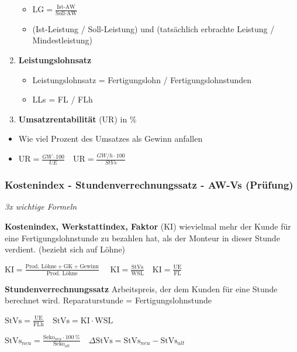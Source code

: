 \begin{enumerate}
  \begin{itemize}
  \item
    $\boxed{\text{LG} = \frac{\text{Ist-AW}}{\text{Soll-AW}}}$
  \item
    (Ist-Leistung / Soll-Leistung) und (tatsächlich erbrachte Leistung /
    Mindestleistung)
  \end{itemize}
\item
  \textbf{Leistungslohnsatz}

  \begin{itemize}
  \item
    Leistungslohnsatz = Fertigungslohn / Fertigungslohnstunden
  \item
    LLs = FL / FLh
  \end{itemize}
\item
  \textbf{Umsatzrentabilität} (UR) in \%
\end{enumerate}

\begin{itemize}
\item
  Wie viel Prozent des Umsatzes als Gewinn anfallen
\item
  $\boxed{\text{UR} = \frac{GW \cdot 100}{UE}} \quad \boxed{\text{UR} = \frac{GW/h \cdot 100}{StVs}}$
\end{itemize}

\subsubsection{Kostenindex - Stundenverrechnungssatz - AW-Vs
(Prüfung)}\label{kostenindex-stundenverrechnungssatz-aw-vs-pruefung}

\emph{3x wichtige Formeln}

\textbf{Kostenindex, Werkstattindex, Faktor} (KI) wievielmal mehr der
Kunde für eine Fertigungslohnstunde zu bezahlen hat, als der Monteur in
dieser Stunde verdient. (bezieht sich auf Löhne)

$\boxed{\text{KI} = \frac{\text{Prod. Löhne} + \text{GK} + \text{Gewinn}}{\text{Prod. Löhne}}} \quad$
$\boxed{\text{KI} = \frac{\text{StVs}}{\text{WSL}}} \quad \boxed{\text{KI} = \frac{\text{UE}}{\text{FL}}}$

\textbf{Stundenverrechnungssatz} Arbeitspreis, der dem Kunden für eine
Stunde berechnet wird. Reparaturstunde = Fertigungslohnstunde

$\boxed{\text{StVs} = \frac{\text{UE}}{\text{FLh}}} \quad \boxed{\text{StVs} = \text{KI} \cdot \text{WSL}}$

$\boxed{\text{StVs}_{neu} = \frac{\text{Seko}_{neu} \cdot 100~\%}{\text{Seko}_{alt}}} \quad \boxed{\Delta \text{StVs} = \text{StVs}_{neu} - \text{StVs}_{alt}}$


